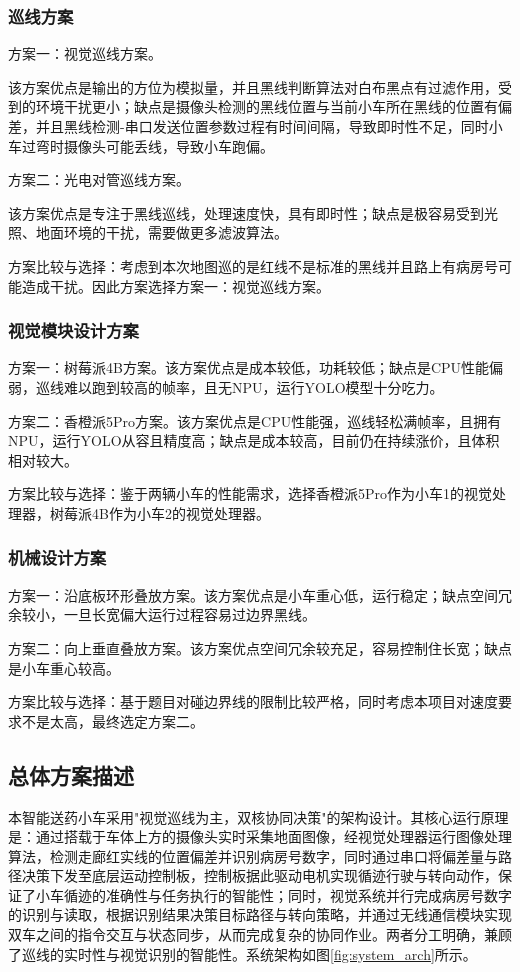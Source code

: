 \documentclass[UTF-8,zihao=-4]{ctexart}
\begin{document}
\subsubsection{巡线方案}

方案一：视觉巡线方案。

该方案优点是输出的方位为模拟量，并且黑线判断算法对白布黑点有过滤作用，受到的环境干扰更小；缺点是摄像头检测的黑线位置与当前小车所在黑线的位置有偏差，并且黑线检测-串口发送位置参数过程有时间间隔，导致即时性不足，同时小车过弯时摄像头可能丢线，导致小车跑偏。

方案二：光电对管巡线方案。

该方案优点是专注于黑线巡线，处理速度快，具有即时性；缺点是极容易受到光照、地面环境的干扰，需要做更多滤波算法。

方案比较与选择：考虑到本次地图巡的是红线不是标准的黑线并且路上有病房号可能造成干扰。因此方案选择方案一：视觉巡线方案。

\subsubsection{视觉模块设计方案}

方案一：树莓派4B方案。该方案优点是成本较低，功耗较低；缺点是CPU性能偏弱，巡线难以跑到较高的帧率，且无NPU，运行YOLO模型十分吃力。

方案二：香橙派5Pro方案。该方案优点是CPU性能强，巡线轻松满帧率，且拥有NPU，运行YOLO从容且精度高；缺点是成本较高，目前仍在持续涨价，且体积相对较大。

方案比较与选择：鉴于两辆小车的性能需求，选择香橙派5Pro作为小车1的视觉处理器，树莓派4B作为小车2的视觉处理器。

\subsubsection{机械设计方案}

方案一：沿底板环形叠放方案。该方案优点是小车重心低，运行稳定；缺点空间冗余较小，一旦长宽偏大运行过程容易过边界黑线。

方案二：向上垂直叠放方案。该方案优点空间冗余较充足，容易控制住长宽；缺点是小车重心较高。

方案比较与选择：基于题目对碰边界线的限制比较严格，同时考虑本项目对速度要求不是太高，最终选定方案二。

\subsection{总体方案描述}

本智能送药小车采用"视觉巡线为主，双核协同决策"的架构设计。其核心运行原理是：通过搭载于车体上方的摄像头实时采集地面图像，经视觉处理器运行图像处理算法，检测走廊红实线的位置偏差并识别病房号数字，同时通过串口将偏差量与路径决策下发至底层运动控制板，控制板据此驱动电机实现循迹行驶与转向动作，保证了小车循迹的准确性与任务执行的智能性；同时，视觉系统并行完成病房号数字的识别与读取，根据识别结果决策目标路径与转向策略，并通过无线通信模块实现双车之间的指令交互与状态同步，从而完成复杂的协同作业。两者分工明确，兼顾了巡线的实时性与视觉识别的智能性。系统架构如图\ref{fig:system_arch}所示。
\end{document}
